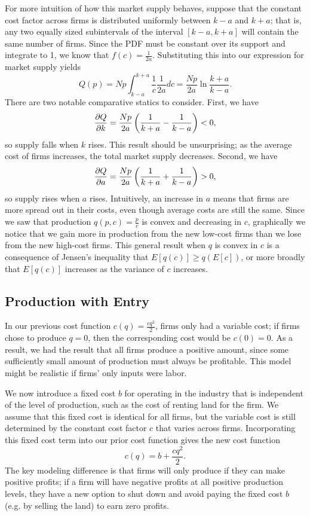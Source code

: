 For more intuition of how this market supply behaves, suppose that the constant cost factor across firms is distributed uniformly between $k-a$ and $k+a$; that is, any two equally sized subintervals of the interval $[k-a, k+a]$ will contain the same number of firms. Since the PDF must be constant over its support and integrate to 1, we know that $f(c) = \frac{1}{2a}$. Substituting this into our expression for market supply yields
$$Q(p)=N p \int_{k-a}^{k+a} \frac{1}{c} \frac{1}{2 a} d c=\frac{N p}{2 a} \ln \frac{k+a}{k-a}.$$
There are two notable comparative statics to consider. First, we have
$$\pdv{Q}{k} = \frac{Np}{2a}\left(\frac{1}{k+a}-\frac{1}{k-a}\right) < 0,$$
so supply falls when $k$ rises. This result should be unsurprising; as the average cost of firms increases, the total market supply decreases. Second, we have
$$\pdv{Q}{a} = \frac{Np}{2a}\left(\frac{1}{k+a}+\frac{1}{k-a}\right) > 0,$$
so supply rises when $a$ rises. Intuitively, an increase in $a$ means that firms are more spread out in their costs, even though average costs are still the same. Since we saw that production $q(p, c) = \frac{p}{c}$ is convex and decreasing in $c$, graphically we notice that we gain more in production from the new low-cost firms than we lose from the new high-cost firms. This general result when $q$ is convex in $c$ is a consequence of Jensen's inequality that $E[q(c)]\geq q(E[c])$, or more broadly that $E[q(c)]$ increases as the variance of $c$ increases.

\subsection*{Production with Entry}
In our previous cost function $c(q) = \frac{cq^2}{2}$, firms only had a variable cost; if firms chose to produce $q=0$, then the corresponding cost would be $c(0) = 0.$ As a result, we had the result that all firms produce a positive amount, since some sufficiently small amount of production must always be profitable. This model might be realistic if firms' only inputs were labor. 

We now introduce a fixed cost $b$ for operating in the industry that is independent of the level of production, such as the cost of renting land for the firm. We assume that this fixed cost is identical for all firms, but the variable cost is still determined by the constant cost factor $c$ that varies across firms. Incorporating this fixed cost term into our prior cost function gives the new cost function
$$c(q) = b + \frac{cq^2}{2}.$$
The key modeling difference is that firms will only produce if they can make positive profits; if a firm will have negative profits at all positive production levels, they have a new option to shut down and avoid paying the fixed cost $b$ (e.g. by selling the land) to earn zero profits. 

